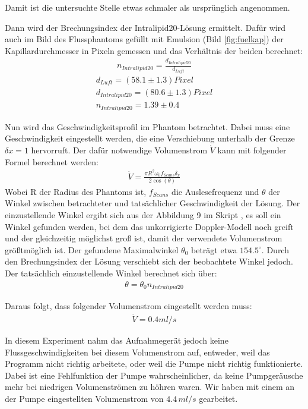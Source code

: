\documentclass[german, %
parskip=full, %
bibliography=totoc, %
]{scrartcl}
\begin{document}
Damit ist die untersuchte Stelle etwas schmaler als ursprünglich angenommen.

Dann wird der Brechungsindex der Intralipid20-Lösung ermittelt. Dafür wird auch im Bild des Flussphantoms gefüllt mit Emulsion (Bild \ref{fig:fuelkap}) der Kapillardurchmesser in Pixeln gemessen und das Verhältnis der beiden berechnet: 
\begin{align}
n_{Intralipid20} = \frac{d_{Intralipid20}}{d_{Luft}}
\end{align}
\begin{align*}
d_{Luft} = (58.1 \pm 1.3) Pixel \\
d_{Intralipid20} = (80.6 \pm 1.3) Pixel \\
n_{Intralipid20} = 1.39 \pm 0.4
\end{align*}

Nun wird das Geschwindigkeitsprofil im Phantom betrachtet. Dabei muss eine Geschwindigkeit eingestellt werden, die eine Verschiebung unterhalb der Grenze $\delta x = 1$ hervorruft. Der dafür notwendige Volumenstrom $\dot V$ kann mit folgender Formel berechnet werden: 
\begin{align}
\dot V = \frac{\pi R^2 \omega_0 f_{Scans} \delta_x}{2 \cos (\theta)}
\end{align}
Wobei R der Radius des Phantoms ist, $f_{Scans}$ die Auslesefrequenz und $\theta$ der Winkel zwischen betrachteter und tatsächlicher Geschwindigkeit der Lösung. Der einzustellende Winkel ergibt sich aus der Abbildung 9 im Skript \cite{Skript}, es soll ein Winkel gefunden werden, bei dem das unkorrigierte Doppler-Modell noch greift und der gleichzeitig möglichst groß ist, damit der verwendete Volumenstrom größtmöglich ist. Der gefundene Maximalwinkel $\theta_0$ beträgt etwa $154.5^\circ$. Durch den Brechungsindex der Lösung verschiebt sich der beobachtete Winkel jedoch. Der tatsächlich einzustellende Winkel berechnet sich über:
\begin{align}
\theta = \theta_0 n_{Intralipid20}
\end{align}

Daraus folgt, dass folgender Volumenstrom eingestellt werden muss:
\begin{align*}
\dot V = 0.4 ml / s
\end{align*}

In diesem Experiment nahm das Aufnahmegerät jedoch keine Flussgeschwindigkeiten bei diesem Volumenstrom auf, entweder, weil das Programm nicht richtig arbeitete, oder weil die Pumpe nicht richtig funktionierte. Dabei ist eine Fehlfunktion der Pumpe wahrscheinlicher, da keine Pumpgeräusche mehr bei niedrigen Volumenströmen zu höhren waren. Wir haben mit einem an der Pumpe eingestellten Volumenstrom von $4.4\, ml/s$ gearbeitet.
\end{document}

